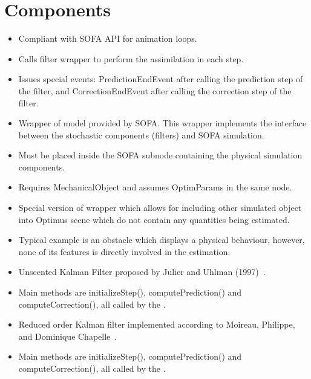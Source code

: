 \documentclass[10pt]{article}
\begin{document}
\section{Components}
{\large \al}
\begin{itemize}
\item Compliant with SOFA API for animation loops. 
\item Calls filter wrapper to perform the assimilation in each step.
\item Issues special events: PredictionEndEvent after calling the prediction step of the filter, and CorrectionEndEvent after calling the correction step of the filter.
\end{itemize}
\medskip
{\large\ssw}
\begin{itemize}
\item Wrapper of model provided by SOFA. This wrapper implements the interface between the stochastic components (filters) and SOFA simulation.
\item Must be placed inside the SOFA subnode containing the physical simulation components.
\item Requires MechanicalObject and assumes OptimParams in the same node.
\end{itemize}
\medskip
{\large\psw}
\begin{itemize}
\item Special version of wrapper which allows for including other simulated object into Optimus scene which do not contain any quantities being estimated.
\item Typical example is an obstacle which displays a physical behaviour, however, none of its features is directly involved in the estimation.
\end{itemize}
\medskip
{\large \ukf}
\begin{itemize}
\item Unscented Kalman Filter proposed by Julier and Uhlman (1997)~\cite{JulierUnscentedKF1995, JulierKalmanFExtension1997}.
\item Main methods are initializeStep(), computePrediction() and computeCorrection(), all called by the \al.
\end{itemize}
\medskip
{\large \roukf}
\begin{itemize}
\item Reduced order Kalman filter implemented according to Moireau, Philippe, and Dominique Chapelle~\cite{MoireauReducedOrder2011}.
\item Main methods are initializeStep(), computePrediction() and computeCorrection(), all called by the \al.
\end{itemize}
\end{document}
